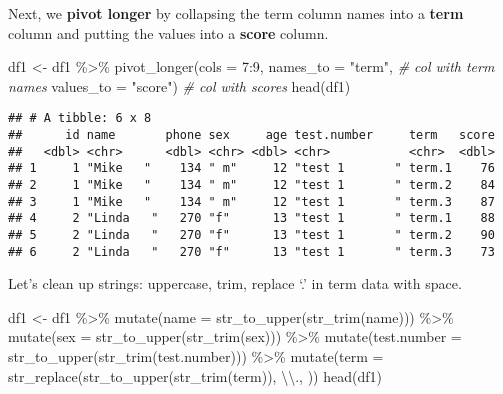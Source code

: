 \documentclass[
]{article}
\newenvironment{Shaded}{\begin{snugshade}}{\end{snugshade}}
\newcommand{\AttributeTok}[1]{\textcolor[rgb]{0.77,0.63,0.00}{#1}}
\newcommand{\CommentTok}[1]{\textcolor[rgb]{0.56,0.35,0.01}{\textit{#1}}}
\newcommand{\DecValTok}[1]{\textcolor[rgb]{0.00,0.00,0.81}{#1}}
\newcommand{\FunctionTok}[1]{\textcolor[rgb]{0.00,0.00,0.00}{#1}}
\newcommand{\NormalTok}[1]{#1}
\newcommand{\OtherTok}[1]{\textcolor[rgb]{0.56,0.35,0.01}{#1}}
\newcommand{\SpecialCharTok}[1]{\textcolor[rgb]{0.00,0.00,0.00}{#1}}
\newcommand{\StringTok}[1]{\textcolor[rgb]{0.31,0.60,0.02}{#1}}
\begin{document}
Next, we \textbf{pivot longer} by collapsing the term column names into
a \textbf{term} column and putting the values into a \textbf{score}
column.

\begin{Shaded}
\begin{Highlighting}[]
\NormalTok{df1 }\OtherTok{\textless{}{-}}\NormalTok{ df1 }\SpecialCharTok{\%\textgreater{}\%}
        \FunctionTok{pivot\_longer}\NormalTok{(}\AttributeTok{cols =} \DecValTok{7}\SpecialCharTok{:}\DecValTok{9}\NormalTok{,}
                     \AttributeTok{names\_to =} \StringTok{"term"}\NormalTok{,     }\CommentTok{\# col with term names }
                     \AttributeTok{values\_to =} \StringTok{"score"}\NormalTok{)   }\CommentTok{\# col with scores}
\FunctionTok{head}\NormalTok{(df1)}
\end{Highlighting}
\end{Shaded}

\begin{verbatim}
## # A tibble: 6 x 8
##      id name       phone sex     age test.number     term   score
##   <dbl> <chr>      <dbl> <chr> <dbl> <chr>           <chr>  <dbl>
## 1     1 "Mike   "    134 " m"     12 "test 1       " term.1    76
## 2     1 "Mike   "    134 " m"     12 "test 1       " term.2    84
## 3     1 "Mike   "    134 " m"     12 "test 1       " term.3    87
## 4     2 "Linda   "   270 "f"      13 "test 1       " term.1    88
## 5     2 "Linda   "   270 "f"      13 "test 1       " term.2    90
## 6     2 "Linda   "   270 "f"      13 "test 1       " term.3    73
\end{verbatim}

Let's clean up strings: uppercase, trim, replace `.' in term data with
space.

\begin{Shaded}
\begin{Highlighting}[]
\NormalTok{df1 }\OtherTok{\textless{}{-}}\NormalTok{ df1 }\SpecialCharTok{\%\textgreater{}\%}        
        \FunctionTok{mutate}\NormalTok{(}\AttributeTok{name =} \FunctionTok{str\_to\_upper}\NormalTok{(}\FunctionTok{str\_trim}\NormalTok{(name))) }\SpecialCharTok{\%\textgreater{}\%} 
        \FunctionTok{mutate}\NormalTok{(}\AttributeTok{sex =} \FunctionTok{str\_to\_upper}\NormalTok{(}\FunctionTok{str\_trim}\NormalTok{(sex))) }\SpecialCharTok{\%\textgreater{}\%}           
        \FunctionTok{mutate}\NormalTok{(}\AttributeTok{test.number =} \FunctionTok{str\_to\_upper}\NormalTok{(}\FunctionTok{str\_trim}\NormalTok{(test.number))) }\SpecialCharTok{\%\textgreater{}\%} 
        \FunctionTok{mutate}\NormalTok{(}\AttributeTok{term =} \FunctionTok{str\_replace}\NormalTok{(}\FunctionTok{str\_to\_upper}\NormalTok{(}\FunctionTok{str\_trim}\NormalTok{(term)), }\StringTok{\textquotesingle{}}\SpecialCharTok{\textbackslash{}\textbackslash{}}\StringTok{.\textquotesingle{}}\NormalTok{, }\StringTok{\textquotesingle{} \textquotesingle{}}\NormalTok{))}
\FunctionTok{head}\NormalTok{(df1)}
\end{Highlighting}
\end{Shaded}
\end{document}
